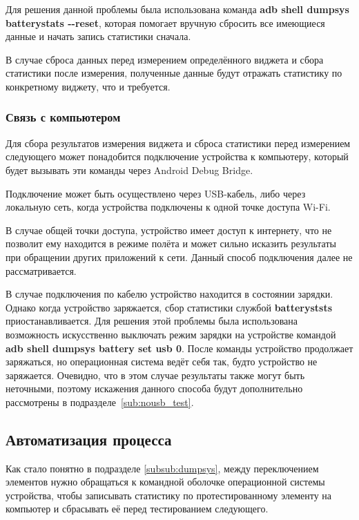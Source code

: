 \documentclass[a4paper,14pt]{extarticle} %
\begin{document}
	Для решения данной проблемы была использована команда \textbf{adb shell dumpsys batterystats -{}-reset}, которая помогает вручную сбросить все имеющиеся данные и начать запись статистики сначала. 
	
	В случае сброса данных перед измерением определённого виджета и сбора статистики после измерения, полученные данные будут отражать статистику по конкретному виджету, что и требуется.
	
	\subsubsection{Связь с компьютером} \label{subsub:connection}
	
	Для сбора результатов измерения виджета и сброса статистики перед измерением следующего может понадобится подключение устройства к компьютеру, который будет вызывать эти команды через Android Debug Bridge.
	
	Подключение может быть осуществлено через USB-кабель, либо через локальную сеть, когда устройства подключены к одной точке доступа Wi-Fi.
	
	В случае общей точки доступа, устройство имеет доступ к интернету, что не позволит ему находится в режиме полёта и может сильно исказить результаты при обращении других приложений к сети. Данный способ подключения далее не рассматривается.
	
	В случае подключения по кабелю устройство находится в состоянии зарядки. Однако когда устройство заряжается, сбор статистики службой \textbf{batteryststs} приостанавливается. Для решения этой проблемы была использована возможность искусственно выключать режим зарядки на устройстве командой \textbf{adb shell dumpsys battery set usb 0}. После команды устройство продолжает заряжаться, но операционная система ведёт себя так, будто устройство не заряжается. Очевидно, что в этом случае результаты также могут быть неточными, поэтому искажения данного способа будут дополнительно рассмотрены в подразделе~\ref{sub:nousb_test}.
	
	\subsection{Автоматизация процесса}
	
	Как стало понятно в подразделе \ref{subsub:dumpsys}, между переключением элементов нужно обращаться к командной оболочке операционной системы устройства, чтобы записывать статистику по протестированному элементу на компьютер и сбрасывать её перед тестированием следующего.
	
\end{document}
